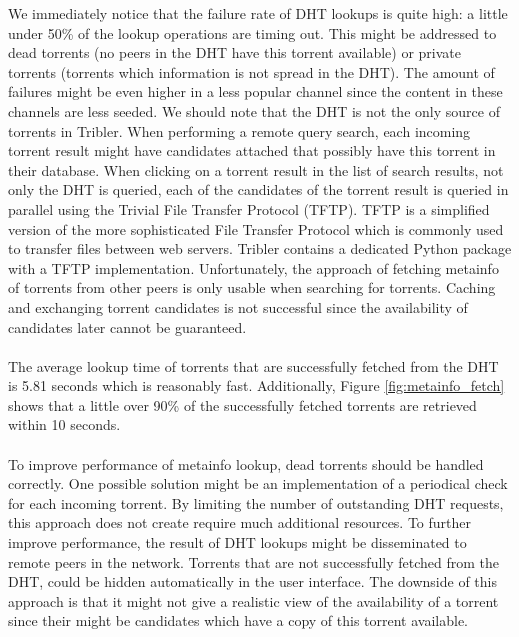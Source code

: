 We immediately notice that the failure rate of DHT lookups is quite high: a little under 50\% of the lookup operations are timing out. This might be addressed to dead torrents (no peers in the DHT have this torrent available) or private torrents (torrents which information is not spread in the DHT). The amount of failures might be even higher in a less popular channel since the content in these channels are less seeded. We should note that the DHT is not the only source of torrents in Tribler. When performing a remote query search, each incoming torrent result might have candidates attached that possibly have this torrent in their database. When clicking on a torrent result in the list of search results, not only the DHT is queried, each of the candidates of the torrent result is queried in parallel using the Trivial File Transfer Protocol (TFTP)\cite{sollins1992tftp}. TFTP is a simplified version of the more sophisticated File Transfer Protocol which is commonly used to transfer files between web servers. Tribler contains a dedicated Python package with a TFTP implementation. Unfortunately, the approach of fetching metainfo of torrents from other peers is only usable when searching for torrents. Caching and exchanging torrent candidates is not successful since the availability of candidates later cannot be guaranteed.\\\\
The average lookup time of torrents that are successfully fetched from the DHT is 5.81 seconds which is reasonably fast. Additionally, Figure \ref{fig:metainfo_fetch} shows that a little over 90\% of the successfully fetched torrents are retrieved within 10 seconds.\\\\
To improve performance of metainfo lookup, dead torrents should be handled correctly. One possible solution might be an implementation of a periodical check for each incoming torrent. By limiting the number of outstanding DHT requests, this approach does not create require much additional resources. To further improve performance, the result of DHT lookups might be disseminated to remote peers in the network. Torrents that are not successfully fetched from the DHT, could be hidden automatically in the user interface. The downside of this approach is that it might not give a realistic view of the availability of a torrent since their might be candidates which have a copy of this torrent available.